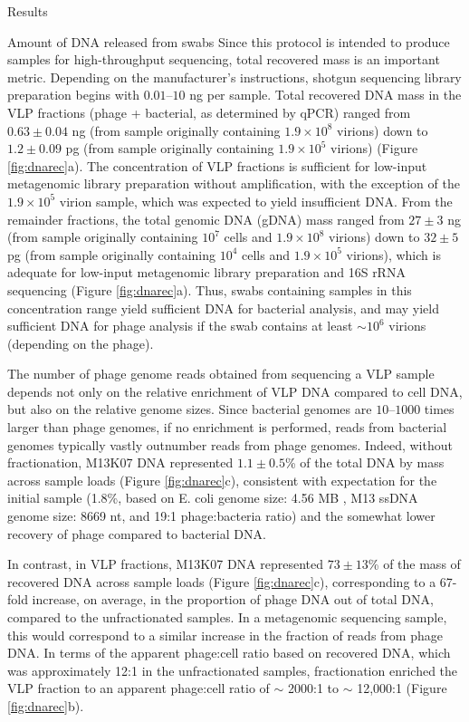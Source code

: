 \documentclass[oneside,12pt,final]{sty/ucthesis-CA2012}
\begin{document}
\begin{mainmatter}
\begin{section}{Results}
\begin{subsection}{Amount of DNA released from swabs}
Since this protocol is intended to produce samples for high-throughput sequencing, total recovered mass is an important metric. Depending on the manufacturer’s instructions, shotgun sequencing library preparation begins with $0.01–10$ ng per sample. Total recovered DNA mass in the VLP fractions (phage + bacterial, as determined by qPCR) ranged from $0.63 \pm 0.04$ ng (from sample originally containing $1.9 \times 10^{8}$ virions) down to $1.2 \pm 0.09$ pg (from sample originally containing $1.9 \times 10^{5}$ virions) (Figure \ref{fig:dnarec}a). The concentration of VLP fractions is sufficient for low-input metagenomic library preparation without amplification, with the exception of the $1.9 \times 10^{5}$ virion sample, which was expected to yield insufficient DNA. From the remainder fractions, the total genomic DNA (gDNA) mass ranged from $27 \pm 3$ ng (from sample originally containing $10^{7}$ cells and $1.9 \times 10^{8}$ virions) down to $32 \pm 5$ pg (from sample originally containing $10^{4}$ cells and $1.9 \times 10^{5}$ virions), which is adequate for low-input metagenomic library preparation and 16S rRNA sequencing (Figure \ref{fig:dnarec}a). Thus, swabs containing samples in this concentration range yield sufficient DNA for bacterial analysis, and may yield sufficient DNA for phage analysis if the swab contains at least $\sim 10^{6}$ virions (depending on the phage).

The number of phage genome reads obtained from sequencing a VLP sample depends not only on the relative enrichment of VLP DNA compared to cell DNA, but also on the relative genome sizes. Since bacterial genomes are $10–1000$ times larger than phage genomes, if no enrichment is performed, reads from bacterial genomes typically vastly outnumber reads from phage genomes. Indeed, without fractionation, M13K07 DNA represented $1.1 \pm 0.5$\% of the total DNA by mass across sample loads (Figure \ref{fig:dnarec}c), consistent with expectation for the initial sample (1.8\%, based on E. coli genome size: 4.56 MB \cite{RN69}, M13 ssDNA genome size: 8669 nt, and 19:1 phage:bacteria ratio) and the somewhat lower recovery of phage compared to bacterial DNA.

In contrast, in VLP fractions, M13K07 DNA represented $73 \pm 13$\% of the mass of recovered DNA across sample loads (Figure \ref{fig:dnarec}c), corresponding to a 67-fold increase, on average, in the proportion of phage DNA out of total DNA, compared to the unfractionated samples. In a metagenomic sequencing sample, this would correspond to a similar increase in the fraction of reads from phage DNA. In terms of the apparent phage:cell ratio based on recovered DNA, which was approximately 12:1 in the unfractionated samples, fractionation enriched the VLP fraction to an apparent phage:cell ratio of $\sim$ 2000:1 to $\sim$ 12,000:1 (Figure \ref{fig:dnarec}b).


\end{subsection}
\end{section}
\end{mainmatter}
\end{document}
